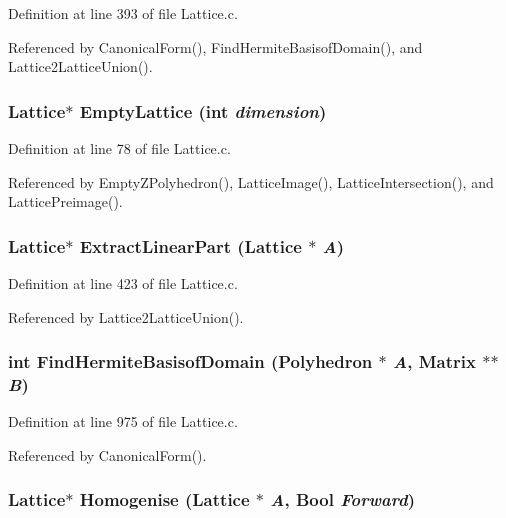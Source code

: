 Definition at line 393 of file Lattice.c.

Referenced by Canonical\-Form(), Find\-Hermite\-Basisof\-Domain(), and Lattice2Lattice\-Union().

\subsubsection{\setlength{\rightskip}{0pt plus 5cm}Lattice$\ast$ Empty\-Lattice (int {\em dimension})}\label{Lattice_8c_a5}




Definition at line 78 of file Lattice.c.

Referenced by Empty\-ZPolyhedron(), Lattice\-Image(), Lattice\-Intersection(), and Lattice\-Preimage().

\subsubsection{\setlength{\rightskip}{0pt plus 5cm}Lattice$\ast$ Extract\-Linear\-Part (Lattice $\ast$ {\em A})}\label{Lattice_8c_a14}




Definition at line 423 of file Lattice.c.

Referenced by Lattice2Lattice\-Union().

\subsubsection{\setlength{\rightskip}{0pt plus 5cm}int Find\-Hermite\-Basisof\-Domain (Polyhedron $\ast$ {\em A}, Matrix $\ast$$\ast$ {\em B})}\label{Lattice_8c_a23}




Definition at line 975 of file Lattice.c.

Referenced by Canonical\-Form().

\subsubsection{\setlength{\rightskip}{0pt plus 5cm}Lattice$\ast$ Homogenise (Lattice $\ast$ {\em A}, Bool {\em Forward})}\label{Lattice_8c_a10}




